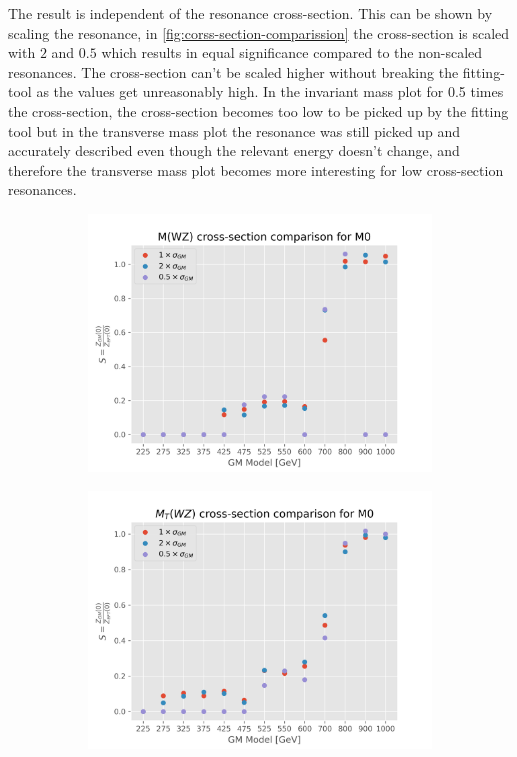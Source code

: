 \documentclass[../Bachelorarbeit.tex]{subfiles}
\begin{document}
\newpage
The result is independent of the resonance cross-section. This can be shown by scaling the resonance, in \ref{fig:corss-section-comparission} the cross-section is scaled with $2$ and $0.5$ which results in equal significance compared to the non-scaled resonances.
The cross-section can't be scaled higher without breaking the fitting-tool as the values get unreasonably high. In the invariant mass plot for 0.5 times the cross-section, the cross-section becomes too low to be picked up by the fitting tool but in the transverse mass plot
the resonance was still picked up and accurately described even though the relevant energy doesn't change, and therefore the transverse mass plot becomes more interesting for low cross-section resonances.
\begin{figure}[h]
    \centering
    \begin{subfigure}{0.45\textwidth}
        \includegraphics[width=\textwidth]{Plots/gm_relevanze/MWZ_comparision_M0.png}
        \caption{}
    \end{subfigure}
    \begin{subfigure}{0.45\textwidth}
        \includegraphics[width=\textwidth]{Plots/gm_relevanze/MTWZ_comparision_M0.png}

\end{subfigure}
\end{figure}
\end{document}
